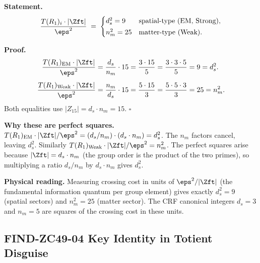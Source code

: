 \documentclass[12pt, a4paper]{article}
\begin{document}
\begin{derivedbox}[title={FIND-ZC49-03: $T(R_1)_i\cdot
  |\mathbb{Z}_{15}|/\varepsilon_0^2 = \text{sector size}^2$}]
\textbf{Statement.}
\begin{equation}
  \frac{T(R_1)_i\cdot|\Zft|}{\eps^2}
  \;=\;
  \begin{cases}
    d_s^2 = 9  & \text{spatial-type (EM, Strong),}\\[2pt]
    n_m^2 = 25 & \text{matter-type (Weak).}
  \end{cases}
  \label{eq:perfect-sq}
\end{equation}

\textbf{Proof.}
\begin{align*}
  \frac{T(R_1)_{\rm EM}\cdot|\Zft|}{\eps^2}
  &= \frac{d_s}{n_m}\cdot 15
   = \frac{3\cdot 15}{5}
   = \frac{3\cdot 3\cdot 5}{5}
   = 9 = d_s^2.\\[4pt]
  \frac{T(R_1)_{\rm Weak}\cdot|\Zft|}{\eps^2}
  &= \frac{n_m}{d_s}\cdot 15
   = \frac{5\cdot 15}{3}
   = \frac{5\cdot 5\cdot 3}{3}
   = 25 = n_m^2.
\end{align*}
Both equalities use $|Z_{15}| = d_s\cdot n_m = 15$.
\hfill$\square$

\textbf{Why these are perfect squares.}
$T(R_1)_{\rm EM}\cdot|\Zft|/\eps^2
= (d_s/n_m)\cdot(d_s\cdot n_m) = d_s^2$.
The $n_m$ factors cancel, leaving $d_s^2$.
Similarly $T(R_1)_{\rm Weak}\cdot|\Zft|/\eps^2 = n_m^2$.
The perfect squares arise because $|\Zft| = d_s\cdot n_m$
(the group order is the product of the two primes), so
multiplying a ratio $d_s/n_m$ by $d_s\cdot n_m$ gives $d_s^2$.

\textbf{Physical reading.}
Measuring crossing cost in units of $\eps^2/|\Zft|$
(the fundamental information quantum per group element)
gives exactly $d_s^2 = 9$ (spatial sectors) and
$n_m^2 = 25$ (matter sector).
The CRF canonical integers $d_s = 3$ and $n_m = 5$
are squares of the crossing cost in these units.
\end{derivedbox}

\subsection{FIND-ZC49-04 \quad Key Identity in Totient Disguise}
\label{sec:find04}
\end{document}
